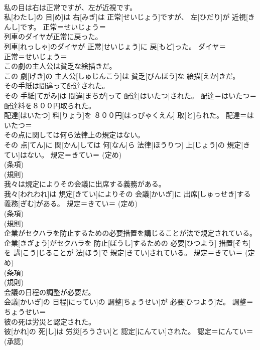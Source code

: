 \documentclass[8pt]{extreport}
\begin{document}
\begin{CJK}{UTF8}{min}
{\\	私の目は右は正常ですが、左が近視です。	
\\	私[わたし]の 目[め]は 右[みぎ]は 正常[せいじょう]ですが、 左[ひだり]が 近視[きんし]です。	正常＝せいじょう＝ 
\\	列車のダイヤが正常に戻った。	
\\	列車[れっしゃ]のダイヤが 正常[せいじょう]に 戻[もど]った。	ダイヤ＝ 
\\	正常＝せいじょう＝ 
\\	この劇の主人公は貧乏な絵描きだ。	
\\	この 劇[げき]の 主人公[しゅじんこう]は 貧乏[びんぼう]な 絵描[えか]きだ。	
\\	その手紙は間違って配達された。	
\\	その 手紙[てがみ]は 間違[まちが]って 配達[はいたつ]された。	配達＝はいたつ＝ 
\\	配達料を８００円取られた。	
\\	配達[はいたつ] 料[りょう]を ８００円[はっぴゃくえん] 取[と]られた。	配達＝はいたつ＝ 
\\	その点に関しては何ら法律上の規定はない。	
\\	その 点[てん]に 関[かん]しては 何[なん]ら 法律[ほうりつ] 上[じょう]の 規定[きてい]はない。	規定＝きてい＝ (定め) 
\\	(条項) 
\\	(規則) 
\\	我々は規定によりその会議に出席する義務がある。	
\\	我々[われわれ]は 規定[きてい]によりその 会議[かいぎ]に 出席[しゅっせき]する 義務[ぎむ]がある。	規定＝きてい＝ (定め) 
\\	(条項) 
\\	(規則) 
\\	企業がセクハラを防止するための必要措置を講じることが法で規定されている。	
\\	企業[きぎょう]がセクハラを 防止[ぼうし]するための 必要[ひつよう] 措置[そち]を 講[こう]じることが 法[ほう]で 規定[きてい]されている。	規定＝きてい＝ (定め) 
\\	(条項) 
\\	(規則) 
\\	会議の日程の調整が必要だ。	
\\	会議[かいぎ]の 日程[にってい]の 調整[ちょうせい]が 必要[ひつよう]だ。	調整＝ちょうせい＝ 
\\	彼の死は労災と認定された。	
\\	彼[かれ]の 死[し]は 労災[ろうさい]と 認定[にんてい]された。	認定＝にんてい＝ 
\\	(承認) 
}
\end{CJK}
\end{document}
